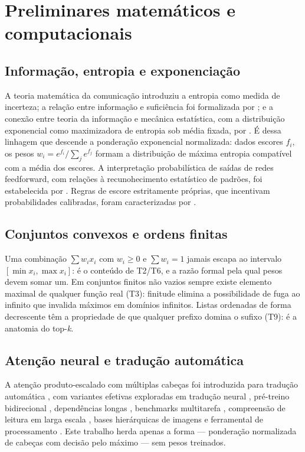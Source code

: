 \chapter{Preliminares matemáticos e computacionais}
\section{Informação, entropia e exponenciação}
A teoria matemática da comunicação \cite{shannon1948} introduziu a entropia como medida de incerteza; a relação entre informação e suficiência foi formalizada por \cite{kullback1951}; e a conexão entre teoria da informação e mecânica estatística, com a distribuição exponencial como maximizadora de entropia sob média fixada, por \cite{jaynes1957}. É dessa linhagem que descende a ponderação exponencial normalizada: dados escores $f_i$, os pesos $w_i=e^{f_i}/\sum_j e^{f_j}$ formam a distribuição de máxima entropia compatível com a média dos escores. A interpretação probabilística de saídas de redes feedforward, com relações à recunohecimento estatístico de padrões, foi estabelecida por \cite{bridle1990}. Regras de escore estritamente próprias, que incentivam probabilidades calibradas, foram caracterizadas por \cite{gneiting2007}.
\section{Conjuntos convexos e ordens finitas}
Uma combinação $\sum w_ix_i$ com $w_i\geq0$ e $\sum w_i=1$ jamais escapa ao intervalo $[\min x_i,\max x_i]$: é o conteúdo de T2/T6, e a razão formal pela qual pesos devem somar um. Em conjuntos finitos não vazios sempre existe elemento maximal de qualquer função real (T3): finitude elimina a possibilidade de fuga ao infinito que invalida máximos em domínios infinitos. Listas ordenadas de forma decrescente têm a propriedade de que qualquer prefixo domina o sufixo (T9): é a anatomia do top-\textit{k}.
\section{Atenção neural e tradução automática}
A atenção produto-escalado com múltiplas cabeças foi introduzida para tradução automática \cite{vaswani2017}, com variantes efetivas exploradas em tradução neural \cite{luong2015}, pré-treino bidirecional \cite{devlin2019}, dependências longas \cite{dai2019}, benchmarks multitarefa \cite{wang2018}, compreensão de leitura em larga escala \cite{rajpurkar2016}, bases hierárquicas de imagens \cite{deng2009} e ferramental de processamento \cite{wolf2020}. Este trabalho herda apenas a forma --- ponderação normalizada de cabeças com decisão pelo máximo --- sem pesos treinados.
